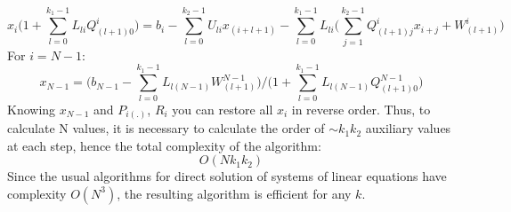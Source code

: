 \documentclass{article}
\begin{document}
\begin{equation}
      x_{i} \Big( 1 +  \sum_{l = 0}^{k_1 - 1} L_{li} Q^{i}_{(l+1)0} \Big)  =  b_i - \sum_{l = 0}^{k_2 - 1} U_{li} x_{(i+l + 1)} - \sum_{l = 0}^{k_1 -1} L_{li} \Big( \sum_{j = 1}^{k_2-1} Q^{i}_{(l+1)j} x_{i + j} + W^{i}_{(l+1)}\Big)
\end{equation}
For $i = N-1$:
\begin{equation}
    x_{N-1} = \Big(b_{N-1} - \sum_{l = 0}^{k_1 - 1} L_{l(N-1)}W^{N-1}_{(l+1)}\Big) / \Big( 1 +  \sum_{l = 0}^{k_1 - 1} L_{l (N-1)} Q^{N-1}_{(l + 1)0}\Big) 
\end{equation}
Knowing $x_{N-1}$ and $P_{i(.)}$, $R_i$ you can restore all $x_i$ in reverse order. Thus, to calculate N values, it is necessary to calculate the order of $\sim k_1 k_2$ auxiliary values at each step, hence the total complexity of the algorithm:
\begin{equation}
    O(Nk_1k_2)
\end{equation}
Since the usual algorithms for direct solution of systems of linear equations have complexity $O(N^3)$, the resulting algorithm is efficient for any $k$.
\end{document}
